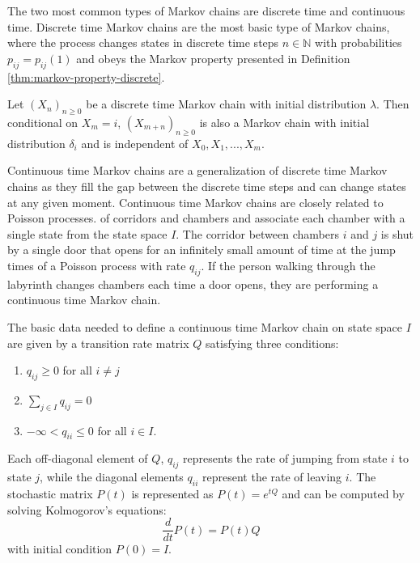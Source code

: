 
The two most common types of Markov chains are discrete time and continuous time.
Discrete time Markov chains are the most basic type of Markov chains, where the process
changes states in discrete time steps $n \in \mathbb{N}$ with probabilities $p_{ij} = p_{ij}(1)$
and obeys the Markov property presented in Definition \ref{thm:markov-property-discrete}.

\begin{defn}
\label{thm:markov-property-discrete}
Let $(X_n)_{n \ge 0}$ be a discrete time Markov chain with initial distribution $\lambda$.
Then conditional on $X_m = i$, $(X_{m + n})_{n \ge 0}$ is also a Markov chain with initial
distribution $\delta_i$ and is independent of $X_0, X_1, ..., X_m$.
\end{defn}

Continuous time Markov chains are a generalization of discrete time Markov chains as they
fill the gap between the discrete time steps and can change states at any given moment.
Continuous time Markov chains are closely related to Poisson processes. %
of corridors and chambers and associate each chamber with a single state from the state space
$I$. The corridor between chambers $i$ and $j$
is shut by a single door that opens for an infinitely small amount of time at the jump times of
a Poisson process with rate $q_{ij}$. If the person walking through the labyrinth changes
chambers each time a door opens, they are performing
a continuous time Markov chain.

The basic data needed to define a continuous time Markov chain on state space $I$ are
given by a transition rate matrix $Q$ satisfying three conditions:
\begin{enumerate}
	\item $q_{ij} \ge 0$ for all $i \ne j$
	\item $\sum_{j \in I} q_{ij} = 0$
	\item $-\infty < q_{ii} \le 0$ for all $i \in I$.
\end{enumerate}

Each off-diagonal element of $Q$, $q_{ij}$ represents the rate of jumping from state $i$ to state $j$,
while the diagonal elements $q_{ii}$ represent the rate of leaving $i$. The stochastic matrix
$P(t)$ is represented as $P(t) = e^{tQ}$ and can be computed by solving Kolmogorov's equations:
\begin{equation}
	\nonumber
	\frac{d}{dt}P(t) = P(t)Q
\end{equation}
with initial condition $P(0) = I$.

